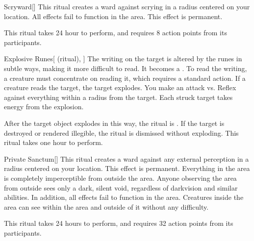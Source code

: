\lowercase{\hypertarget{spell:Scryward}{}}\label{spell:Scryward}
\begin{apability}[Rank 3]{\hypertarget{spell:Scryward}{Scryward}}[]
\targetrule
This ritual creates a ward against scrying in a \arealarge radius  centered on your location.
All  effects fail to function in the area.
This effect is permanent.

This ritual takes 24 hour to perform, and requires 8 action points from its participants.
\end{apability}
\vspace{0.25em}



\lowercase{\hypertarget{spell:Explosive Runes}{}}\label{spell:Explosive Runes}
\begin{attuneability}[Rank 4]{\hypertarget{spell:Explosive Runes}{Explosive Runes}}[ (ritual), ]
The writing on the target is altered by the runes in subtle ways, making it more difficult to read.
It becomes a .
To read the writing, a creature must concentrate on reading it, which requires a standard action.
If a creature reads the target, the target explodes.
You make an attack vs. Reflex against everything within a \areamed radius from the target.
Each struck target takes energy  from the explosion.

After the target object explodes in this way, the ritual is .
If the target is destroyed or rendered illegible, the ritual is dismissed without exploding.
This ritual takes one hour to perform.
\end{attuneability}
\vspace{0.25em}



\lowercase{\hypertarget{spell:Private Sanctum}{}}\label{spell:Private Sanctum}
\begin{apability}[Rank 5]{\hypertarget{spell:Private Sanctum}{Private Sanctum}}[]
\targetrule
This ritual creates a ward against any external perception in a \arealarge radius  centered on your location.
This effect is permanent.
Everything in the area is completely imperceptible from outside the area.
Anyone observing the area from outside sees only a dark, silent void, regardless of darkvision and similar abilities.
In addition, all  effects fail to function in the area.
Creatures inside the area can see within the area and outside of it without any difficulty.

This ritual takes 24 hours to perform, and requires 32 action points from its participants.
\end{apability}
\vspace{0.25em}



